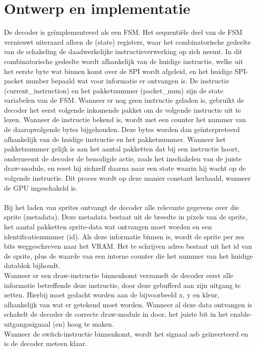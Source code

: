 \documentclass{scrartcl} %
\begin{document}
\section{Ontwerp en implementatie}
De decoder is geïmplementeerd als een FSM. Het sequentiële deel van de FSM vernieuwt uiteraard alleen de (state) registers, waar het combinatorische gedeelte van de schakeling de daadwerkelijke instructieverwerking op zich neemt. In dit combinatorische gedeelte wordt afhankelijk van de huidige instructie, welke uit het eerste byte wat binnen komt over de SPI wordt afgeleid, en het huidige SPI-packet number bepaald wat voor informatie er ontvangen is. De instructie (current\_instruction) en het pakketnummer (packet\_num) zijn de state variabelen van de FSM. Wanneer er nog geen instructie geladen is, gebruikt de decoder het eerst volgende inkomende pakket om de volgende instructie uit te lezen. Wanneer de instructie bekend is, wordt met een counter het nummer van de daaropvolgende bytes bijgehouden. Deze bytes worden dan geïnterpreteerd afhankelijk van de huidige instructie en het pakketnummer. Wanneer het pakketnummer gelijk is aan het aantal pakketten dat bij een instructie hoort, onderneemt de decoder de benodigde actie, zoals het inschakelen van de juiste draw-module, en reset hij zichzelf daarna naar een state waarin hij wacht op de volgende instructie. Dit proces wordt op deze manier constant herhaald, wanneer de GPU ingeschakeld is.
\\\\
Bij het laden van sprites ontvangt de decoder alle relevante gegevens over die sprite (metadata). Deze metadata bestaat uit de breedte in pixels van de sprite, het aantal pakketten sprite-data wat ontvangen moet worden en een identificatienummer (id). Als deze informatie binnen is, wordt de sprite per zes bits weggeschreven naar het VRAM. Het te schrijven adres bestaat uit het id van de sprite, plus de waarde van een interne counter die het nummer van het huidige datablok bijhoudt.
\\
Wanneer er een draw-instructie binnenkomt verzamelt de decoder eerst alle informatie betreffende deze instructie, door deze gebufferd aan zijn uitgang te zetten. Hierbij moet gedacht worden aan de bijvoorbeeld x, y en kleur, afhankelijk van wat er getekend moet worden. Wanneer al deze data ontvangen is schakelt de decoder de correcte draw-module in door, het juiste bit in het enable-uitgangssignaal (en) hoog te maken.
\\
Wanneer de switch-instructie binnenkomt, wordt het signaal asb geïnverteerd en is de decoder meteen klaar.
\end{document}
